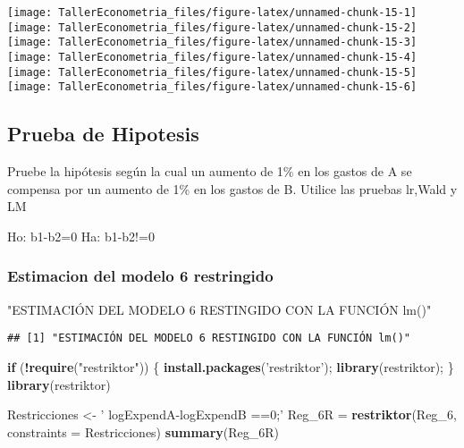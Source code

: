 \documentclass[
]{article}
\newenvironment{Shaded}{\begin{snugshade}}{\end{snugshade}}
\newcommand{\ControlFlowTok}[1]{\textcolor[rgb]{0.13,0.29,0.53}{\textbf{#1}}}
\newcommand{\DataTypeTok}[1]{\textcolor[rgb]{0.13,0.29,0.53}{#1}}
\newcommand{\DecValTok}[1]{\textcolor[rgb]{0.00,0.00,0.81}{#1}}
\newcommand{\KeywordTok}[1]{\textcolor[rgb]{0.13,0.29,0.53}{\textbf{#1}}}
\newcommand{\NormalTok}[1]{#1}
\newcommand{\OperatorTok}[1]{\textcolor[rgb]{0.81,0.36,0.00}{\textbf{#1}}}
\newcommand{\StringTok}[1]{\textcolor[rgb]{0.31,0.60,0.02}{#1}}
\begin{document}
\begin{center}\texttt{[image: TallerEconometria\_files/figure-latex/unnamed-chunk-15-1]} \texttt{[image: TallerEconometria\_files/figure-latex/unnamed-chunk-15-2]} \texttt{[image: TallerEconometria\_files/figure-latex/unnamed-chunk-15-3]} \texttt{[image: TallerEconometria\_files/figure-latex/unnamed-chunk-15-4]} \texttt{[image: TallerEconometria\_files/figure-latex/unnamed-chunk-15-5]} \texttt{[image: TallerEconometria\_files/figure-latex/unnamed-chunk-15-6]} \end{center}

\hypertarget{prueba-de-hipotesis}{%
\subsection{Prueba de Hipotesis}\label{prueba-de-hipotesis}}

Pruebe la hipótesis según la cual un aumento de 1\% en los gastos de A
se compensa por un aumento de 1\% en los gastos de B. Utilice las
pruebas lr,Wald y LM

Ho: b1-b2=0 Ha: b1-b2!=0

\hypertarget{estimacion-del-modelo-6-restringido}{%
\subsubsection{Estimacion del modelo 6
restringido}\label{estimacion-del-modelo-6-restringido}}

\begin{Shaded}
\begin{Highlighting}[]
\StringTok{"ESTIMACIÓN DEL MODELO 6 RESTINGIDO CON LA FUNCIÓN lm()"}
\end{Highlighting}
\end{Shaded}

\begin{verbatim}
## [1] "ESTIMACIÓN DEL MODELO 6 RESTINGIDO CON LA FUNCIÓN lm()"
\end{verbatim}

\begin{Shaded}
\begin{Highlighting}[]
\ControlFlowTok{if}\NormalTok{ (}\OperatorTok{!}\KeywordTok{require}\NormalTok{(}\StringTok{"restriktor"}\NormalTok{)) }
\NormalTok{\{}
  \KeywordTok{install.packages}\NormalTok{(}\StringTok{'restriktor'}\NormalTok{);}
  \KeywordTok{library}\NormalTok{(restriktor);}
\NormalTok{\}}
\KeywordTok{library}\NormalTok{(restriktor)}

\NormalTok{Restricciones <-}\StringTok{ '}
\StringTok{logExpendA-logExpendB ==0;'}
\NormalTok{Reg_6R =}\StringTok{ }\KeywordTok{restriktor}\NormalTok{(Reg_}\DecValTok{6}\NormalTok{, }\DataTypeTok{constraints =}\NormalTok{ Restricciones)}
\KeywordTok{summary}\NormalTok{(Reg_6R)}
\end{Highlighting}
\end{Shaded}
\end{document}
